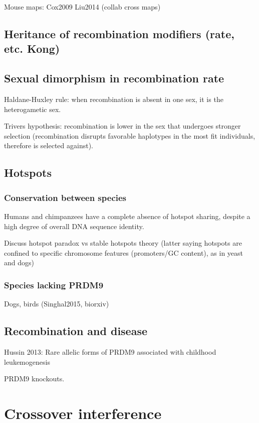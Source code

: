 Mouse maps:
Cox2009
Liu2014 (collab cross maps)

\subsection{Heritance of recombination modifiers (rate, etc. Kong)}
\subsection{Sexual dimorphism in recombination rate}

Haldane-Huxley rule: when recombination is absent in one sex, it is the heterogametic sex.

Trivers hypothesis: recombination is lower in the sex that undergoes stronger selection (recombination disrupts favorable haplotypes in the most fit individuals, therefore is selected against).


\subsection{Hotspots}

\subsubsection{Conservation between species}
Humans and chimpanzees have a complete absence of hotspot sharing, despite a high degree of overall DNA sequence identity\cite{Ptak2005,Winckler2005,Auton2012a}.

Discuss hotspot paradox vs stable hotspots theory (latter saying hotspots are confined to specific chromosome features (promoters/GC content), as in yeast and dogs)
\subsubsection{Species lacking PRDM9}
Dogs, birds (Singhal2015, biorxiv) 

\subsection{Recombination and disease}

Hussin 2013: Rare allelic forms of PRDM9 associated with childhood leukemogenesis

PRDM9 knockouts.

\section{Crossover interference}

